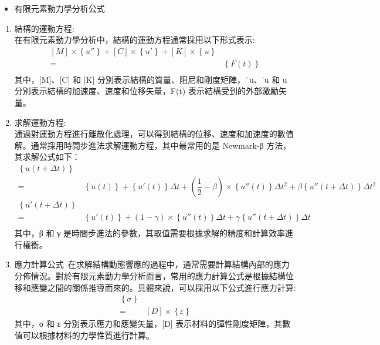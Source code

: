 \begin{itemize}
\item 有限元素動力學分析公式
\end{itemize}
\begin{enumerate}
\item 結構的運動方程:\\
在有限元素動力學分析中，結構的運動方程通常採用以下形式表示:\\
\[
\begin{aligned}
\left[ M\right] \times \left\{ u''\right\} +\left[ C\right] \times \left\{ u'\right\} +\left[ K\right] \times \left\{ u\right\}\\
=&\left\{ F\left( t\right) \right\}\\
\end{aligned}
\]
其中，[M]、[C] 和 [K] 分別表示結構的質量、阻尼和剛度矩陣，{¨u}、{˙u} 和 {u} 分別表示結構的加速度、速度和位移矢量，{F(t)} 表示結構受到的外部激勵矢量。\\

\item 求解運動方程:\\
通過對運動方程進行離散化處理，可以得到結構的位移、速度和加速度的數值解。通常採用時間步進法求解運動方程，其中最常用的是 Newmark-β 方法，其求解公式如下：\\
\[
\begin{aligned}
\left\{ u\left( t+\Delta t\right) \right\}\\
=&\left\{ u\left( t\right) \right\} +\left\{ u'\left( t\right) \right\} \Delta t+\left( \dfrac{1}{2}-\beta \right) \times \left\{ u''\left( t\right) \right\} \Delta t^{2}+\beta \left\{ u''\left( t+\Delta t\right) \right\} \Delta t^{2}\\
\left\{ u'\left( t+\Delta t\right) \right\}\\
=&\left\{ u'\left( t\right) \right\} +\left( 1-\gamma \right) \times \left\{ u''\left( t\right) \right\} \Delta t+\gamma \left\{ u''\left( t+\Delta t\right) \right\} \Delta t\\
\end{aligned}
\]
其中，β 和 γ 是時間步進法的參數，其取值需要根據求解的精度和計算效率進行權衡。\\
\newpage

\item 應力計算公式\
在求解結構動態響應的過程中，通常需要計算結構內部的應力分佈情況。對於有限元素動力學分析而言，常用的應力計算公式是根據結構位移和應變之間的關係推導而來的。具體來說，可以採用以下公式進行應力計算:\\
\[
\begin{aligned}
\left\{ \sigma \right\}\\
=&\left[ D\right] \times \left\{ \varepsilon \right\}
\end{aligned}
\]
其中，{σ} 和 {ε} 分別表示應力和應變矢量，[D] 表示材料的彈性剛度矩陣，其數值可以根據材料的力學性質進行計算。

\end{enumerate}
\newpage

